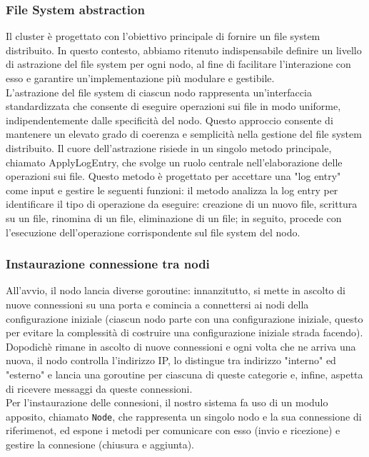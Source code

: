 \subsubsection{File System abstraction}
Il cluster è progettato con l'obiettivo principale di fornire un file system distribuito. In questo contesto, abbiamo ritenuto 
indispensabile definire un livello di astrazione del file system per ogni nodo, al fine di facilitare l'interazione con esso e 
garantire un'implementazione più modulare e gestibile.\\
L'astrazione del file system di ciascun nodo rappresenta un'interfaccia standardizzata che consente di eseguire operazioni sui 
file in modo uniforme, indipendentemente dalle specificità del nodo. Questo approccio consente di mantenere
un elevato grado di coerenza e semplicità nella gestione del file system distribuito.
Il cuore dell'astrazione risiede in un singolo metodo principale, chiamato ApplyLogEntry, che svolge un ruolo centrale nell'elaborazione
delle operazioni sui file. Questo metodo è progettato per accettare una "log entry" come input e 
gestire le seguenti funzioni: il metodo analizza la log entry per identificare il tipo di operazione da eseguire: creazione 
di un nuovo file, scrittura su un file, rinomina di un file, eliminazione di un file; in seguito, procede con 
l'esecuzione dell'operazione corrispondente sul file system del nodo.

\subsubsection{Instaurazione connessione tra nodi}
All'avvio, il nodo lancia diverse goroutine: innanzitutto, si mette in ascolto di nuove connessioni su una porta 
e comincia a connettersi ai nodi della configurazione iniziale
(ciascun nodo parte con una configurazione iniziale, questo per evitare la complessità di costruire una configurazione iniziale strada 
facendo). Dopodichè rimane in ascolto di nuove connessioni e ogni volta che ne arriva una nuova, il nodo controlla
l'indirizzo IP, lo distingue tra indirizzo "interno" ed "esterno" e lancia una goroutine per ciascuna di queste
categorie e, infine, aspetta di ricevere messaggi da queste connessioni. \\
Per l'instaurazione delle connesioni, il nostro sistema fa uso di un modulo apposito, chiamato \texttt{Node}, che 
rappresenta un singolo nodo e la sua connessione di riferimenot, ed espone i metodi per comunicare 
con esso (invio e ricezione) e gestire la connesione (chiusura e aggiunta).

